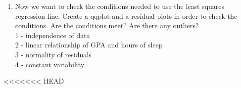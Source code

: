 \documentclass[]{article}
\newenvironment{Shaded}{\begin{snugshade}}{\end{snugshade}}
\newcommand{\DataTypeTok}[1]{\textcolor[rgb]{0.13,0.29,0.53}{#1}}
\newcommand{\KeywordTok}[1]{\textcolor[rgb]{0.13,0.29,0.53}{\textbf{#1}}}
\newcommand{\NormalTok}[1]{#1}
\newcommand{\OperatorTok}[1]{\textcolor[rgb]{0.81,0.36,0.00}{\textbf{#1}}}
\newcommand{\StringTok}[1]{\textcolor[rgb]{0.31,0.60,0.02}{#1}}
\providecommand{\tightlist}{%
  \setlength{\itemsep}{0pt}\setlength{\parskip}{0pt}}
\begin{document}
\begin{Shaded}
\end{Shaded}

\begin{Shaded}
\end{Shaded}

\begin{enumerate}
\def\labelenumi{\arabic{enumi}.}
\setcounter{enumi}{6}
\tightlist
\item
  Now we want to check the conditions needed to use the least squares
  regression line. Create a qqplot and a residual plots in order to
  check the conditions. Are the conditions meet? Are there any
  outliers?\\
  1 - independence of data\\
  2 - linear relationship of GPA and hours of sleep\\
  3 - normality of residuals\\
  4 - constant variability
\end{enumerate}

\textless{}\textless{}\textless{}\textless{}\textless{}\textless{}\textless{}
HEAD

\begin{Shaded}
\end{Shaded}
\end{document}
